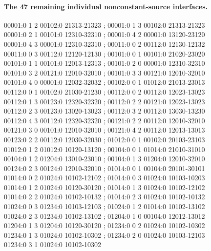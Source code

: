 \documentclass[11pt]{article}
\numberwithin{equation}{section}
\numberwithin{table}{section}
\begin{document}
\paragraph{The 47 remaining individual nonconstant-source interfaces.}
\begingroup\scriptsize\ttfamily\begin{flushleft}
00001:0 1 2 00102:0 21313-21323 ; 00001:0 1 3 00102:0 21313-21323\\
00001:0 2 1 00101:0 12310-32310 ; 00001:0 4 2 00001:0 13120-23120\\
00001:0 4 3 00001:0 12310-32310 ; 00011:0 0 2 00112:0 12130-12132\\
00011:0 0 3 00112:0 12120-12130 ; 00101:0 0 1 00101:0 21020-23020\\
00101:0 1 1 00101:0 12013-12313 ; 00101:0 2 0 00001:0 12310-32310\\
00101:0 3 2 00121:0 12010-32010 ; 00101:0 3 3 00121:0 12010-32010\\
00101:0 4 0 00001:0 12032-32032 ; 00102:0 0 1 01012:0 21013-23013\\
00112:0 0 1 00102:0 21030-21230 ; 00112:0 0 2 00112:0 12023-13023\\
00112:0 1 3 00123:0 12320-32320 ; 00112:0 2 2 00121:0 12023-13023\\
00112:0 2 3 00123:0 13020-13023 ; 00112:0 3 2 00112:0 13030-13230\\
00112:0 4 3 00112:0 12320-32320 ; 00121:0 2 2 00112:0 12010-32010\\
00121:0 3 0 00101:0 12010-32010 ; 00121:0 4 2 00112:0 12013-13013\\
00123:0 2 2 00112:0 12030-32030 ; 01012:0 0 1 00102:0 20103-23103\\
01012:0 1 2 01012:0 10120-13120 ; 00104:0 0 1 01014:0 21010-31010\\
00104:0 1 2 01204:0 13010-23010 ; 00104:0 1 3 01204:0 12010-32010\\
00124:0 2 3 00124:0 12010-32010 ; 01014:0 0 1 00104:0 20101-30101\\
01014:0 0 2 01024:0 10102-12102 ; 01014:0 0 3 01024:0 10103-10203\\
01014:0 1 2 01024:0 10120-30120 ; 01014:0 1 3 01024:0 10102-12102\\
01014:0 2 2 01024:0 10102-10132 ; 01014:0 2 3 01024:0 10102-10132\\
01024:0 0 3 01234:0 10103-12103 ; 01024:0 1 2 01014:0 10102-13102\\
01024:0 2 3 01234:0 10102-13102 ; 01204:0 1 0 00104:0 12012-13012\\
01204:0 1 3 01204:0 10120-30120 ; 01234:0 0 2 01024:0 10102-10302\\
01234:0 1 3 01024:0 10102-10302 ; 01234:0 2 0 01024:0 10103-12103\\
01234:0 3 1 01024:0 10102-10302\\
\end{flushleft}\endgroup
\end{document}
